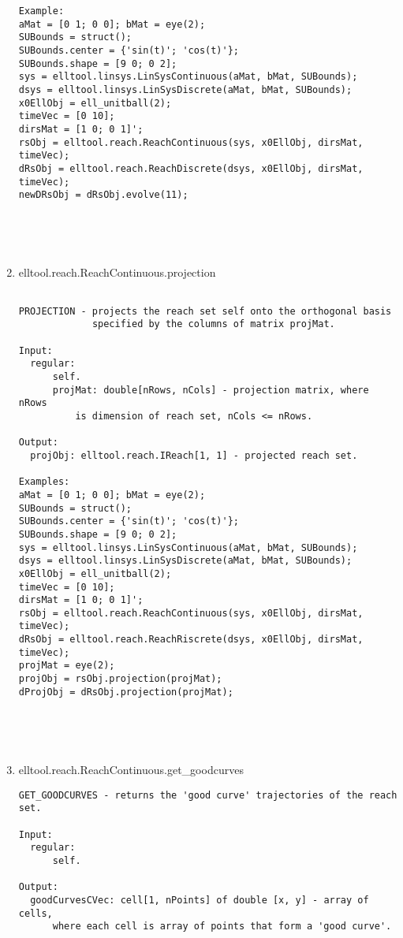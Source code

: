 \begin{enumerate}
\begin{lstlisting}
Example:
aMat = [0 1; 0 0]; bMat = eye(2);
SUBounds = struct();
SUBounds.center = {'sin(t)'; 'cos(t)'};
SUBounds.shape = [9 0; 0 2];
sys = elltool.linsys.LinSysContinuous(aMat, bMat, SUBounds);
dsys = elltool.linsys.LinSysDiscrete(aMat, bMat, SUBounds);
x0EllObj = ell_unitball(2);
timeVec = [0 10];
dirsMat = [1 0; 0 1]';
rsObj = elltool.reach.ReachContinuous(sys, x0EllObj, dirsMat, timeVec);
dRsObj = elltool.reach.ReachDiscrete(dsys, x0EllObj, dirsMat, timeVec);
newDRsObj = dRsObj.evolve(11);





\end{lstlisting}
\fontfamily{\familydefault}
\selectfont
\item {elltool.reach.ReachContinuous.projection}
\selectfont
\begin{lstlisting}

PROJECTION - projects the reach set self onto the orthogonal basis
             specified by the columns of matrix projMat.

Input:
  regular:
      self.
      projMat: double[nRows, nCols] - projection matrix, where nRows
          is dimension of reach set, nCols <= nRows.

Output:
  projObj: elltool.reach.IReach[1, 1] - projected reach set.

Examples:
aMat = [0 1; 0 0]; bMat = eye(2);
SUBounds = struct();
SUBounds.center = {'sin(t)'; 'cos(t)'};
SUBounds.shape = [9 0; 0 2];
sys = elltool.linsys.LinSysContinuous(aMat, bMat, SUBounds);
dsys = elltool.linsys.LinSysDiscrete(aMat, bMat, SUBounds);
x0EllObj = ell_unitball(2);
timeVec = [0 10];
dirsMat = [1 0; 0 1]';
rsObj = elltool.reach.ReachContinuous(sys, x0EllObj, dirsMat, timeVec);
dRsObj = elltool.reach.ReachRiscrete(dsys, x0EllObj, dirsMat, timeVec);
projMat = eye(2);
projObj = rsObj.projection(projMat);
dProjObj = dRsObj.projection(projMat);





\end{lstlisting}
\fontfamily{\familydefault}
\selectfont
\item {elltool.reach.ReachContinuous.get\_goodcurves}
\selectfont
\begin{lstlisting}
GET_GOODCURVES - returns the 'good curve' trajectories of the reach set.

Input:
  regular:
      self.

Output:
  goodCurvesCVec: cell[1, nPoints] of double [x, y] - array of cells,
      where each cell is array of points that form a 'good curve'.


\end{lstlisting}
\end{enumerate}
